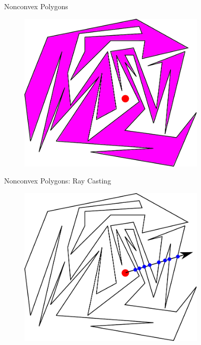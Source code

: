 \documentclass{beamer}
\begin{document}
\begin{frame}{Nonconvex Polygons}

\begin{figure}[t]
	\centering
	\includegraphics[width=0.8\textwidth]{SimplePolygon1Filled.pdf}
\end{figure}

\end{frame}


\begin{frame}{Nonconvex Polygons: Ray Casting}

\begin{figure}[t]
	\centering
	\includegraphics[width=0.8\textwidth]{SimplePolygon1Ray.pdf}
\end{figure}

\end{frame}
\end{document}
